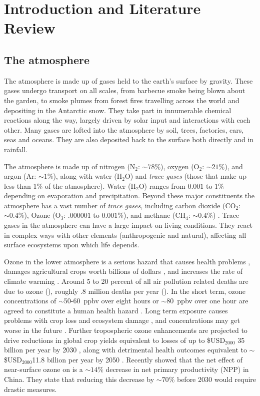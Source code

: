 \chapter{Introduction and Literature Review} %
\label{LR}

\section{The atmosphere}
\label{LR:Atmos}
  The atmosphere is made up of gases held to the earth's surface by gravity. 
  These gases undergo transport on all scales, from barbecue smoke being blown about the garden, to smoke plumes from forest fires travelling across the world and depositing in the Antarctic snow.
  They take part in innumerable chemical reactions along the way, largely driven by solar input and interactions with each other.
  Many gases are lofted into the atmosphere by soil, trees, factories, cars, seas and oceans.
  They are also deposited back to the surface both directly and in rainfall.
  
  The atmosphere is made up of nitrogen (N$_2$: $\sim 78\%$), oxygen (O$_2$: $\sim 21\%$), and argon (Ar: $\sim 1\%$), along with water (H$_2$O) and \textit{trace gases} (those that make up less than 1\% of the atmosphere).
  Water (H$_2$O) ranges from $0.001$ to $1\%$ depending on evaporation and precipitation.
  Beyond these major constituents the atmosphere has a vast number of \textit{trace gases}, including carbon dioxide (CO$_2$: $\sim 0.4\%$), Ozone (O$_3$: $.000001$ to $0.001\%$), and methane (CH$_4$: $\sim 0.4\%$) \citep[][Ch. 2]{BrasseurJacob2017}.
  Trace gases in the atmosphere can have a large impact on living conditions.
  They react in complex ways with other elements (anthropogenic and natural), affecting all surface ecosystems upon which life depends.
  
  Ozone in the lower atmosphere is a serious hazard that causes health problems \citep{Hsieh2013}, damages agricultural crops worth billions of dollars \citep{Avnery2011,Yue2017}, and increases the rate of climate warming \citep{IPCC_2013_chap8}.
  Around 5 to 20 percent of all air pollution related deaths are due to ozone (\cite{Monks2015}), roughly .8 million deaths per year (\cite{Lelieveld2013}).
  In the short term, ozone concentrations of $\sim$50-60~ppbv over eight hours or $\sim$80~ppbv over one hour are agreed to constitute a human health hazard \citep{Ayers2006,Lelieveld2009}. 
  Long term exposure causes problems with crop loss and ecosystem damage \citep{Emberson2003}, and concentrations may get worse in the future \citep{Lelieveld2009, Stevenson2013}.
  Further tropospheric ozone enhancements are projected to drive reductions in global crop yields equivalent to losses of up to \$USD$_{2000}$ 35 billion per year by 2030 \citep{Avnery2011}, along with detrimental health outcomes equivalent to $\sim$\$USD$_{2000}$11.8 billion per year by 2050 \citep{Selin2009}.
  Recently \cite{Yue2017} showed that the net effect of near-surface ozone on is a $\sim 14\%$ decrease in net primary productivity (NPP) in China.
  They state that reducing this decrease by $\sim 70\%$ before 2030 would require drastic measures.
  
